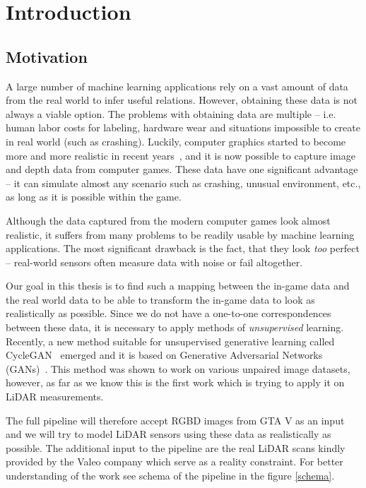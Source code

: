 \chapter{Introduction}

\section{Motivation}

A large number of machine learning applications rely on a vast amount of data from the real world to infer useful relations. However, obtaining these data is not always a viable option. The problems with obtaining data are multiple -- i.e. human labor costs for labeling, hardware wear and situations impossible to create in real world (such as crashing). Luckily, computer graphics started to become more and more realistic in recent years~\cite{matrix}, and it is now possible to capture image and depth data from computer games. These data have one significant advantage -- it can simulate almost any scenario such as crashing, unusual environment, etc., as long as it is possible within the game.

Although the data captured from the modern computer games look almost realistic, it suffers from many problems to be readily usable by machine learning applications. The most significant drawback is the fact, that they look {\em too} perfect -- real-world sensors often measure data with noise or fail altogether.

Our goal in this thesis is to find such a mapping between the in-game data and the real world data to be able to transform the in-game data to look as realistically as possible. Since we do not have a one-to-one correspondences between these data, it is necessary to apply methods of {\em unsupervised} learning. Recently, a new method suitable for unsupervised generative learning called CycleGAN~\cite{cyclegan} emerged and it is based on Generative Adversarial Networks (GANs)~\cite{origgan}. This method was shown to work on various unpaired image datasets, however, as far as we know this is the first work which is trying to apply it on LiDAR measurements.

The full pipeline will therefore accept RGBD images from GTA V as an input and we will try to model LiDAR sensors using these data as realistically as possible. The additional input to the pipeline are the real LiDAR scans kindly provided by the Valeo company which serve as a reality constraint. For better understanding of the work see schema of the pipeline in the figure \ref{schema}.

